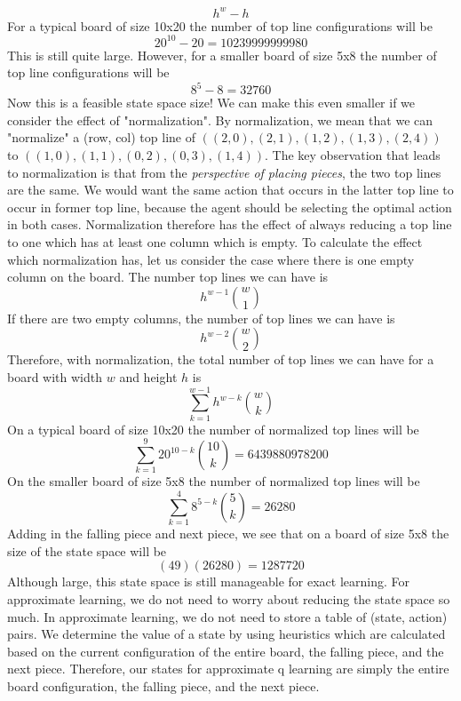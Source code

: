 \documentclass[11pt]{article}
\begin{document}
$$h^w - h$$
For a typical board of size 10x20 the number of top line configurations will be
$$20^{10} - 20 = 10239999999980$$
This is still quite large. However, for a smaller board of size 5x8 the number of top line configurations will be
$$8^5 - 8 = 32760$$
Now this is a feasible state space size! We can make this even smaller if we consider the effect of "normalization". By normalization, we mean that we can "normalize" a (row, col) top line of $((2,0),(2,1),(1,2),(1,3),(2,4))$ to $((1,0),(1,1),(0,2),(0,3),(1,4))$. The key observation that leads to normalization is that from the \textit{perspective of placing pieces}, the two top lines are the same. We would want the same action that occurs in the latter top line to occur in former top line, because the agent should be selecting the optimal action in both cases. Normalization therefore has the effect of always reducing a top line to one which has at least one column which is empty. To calculate the effect which normalization has, let us consider the case where there is one empty column on the board. The number top lines we can have is
$$h^{w-1}\binom{w}{1}$$
If there are two empty columns, the number of top lines we can have is
$$h^{w-2}\binom{w}{2}$$
Therefore, with normalization, the total number of top lines we can have for a board with width $w$ and height $h$ is
$$\sum_{k=1}^{w-1}h^{w-k}\binom{w}{k}$$
On a typical board of size 10x20 the number of normalized top lines will be
$$\sum_{k=1}^{9} 20^{10-k}\binom{10}{k} = 6439880978200$$
On the smaller board of size 5x8 the number of normalized top lines will be
$$\sum_{k=1}^{4} 8^{5-k}\binom{5}{k} = 26280$$
Adding in the falling piece and next piece, we see that on a board of size 5x8 the size of the state space will be
$$(49)(26280) = 1287720$$
Although large, this state space is still manageable for exact learning. For approximate learning, we do not need to worry about reducing the state space so much. In approximate learning, we do not need to store a table of (state, action) pairs. We determine the value of a state by using heuristics which are calculated based on the current configuration of the entire board, the falling piece, and the next piece. Therefore, our states for approximate q learning are simply the entire board configuration, the falling piece, and the next piece.
\end{document}
